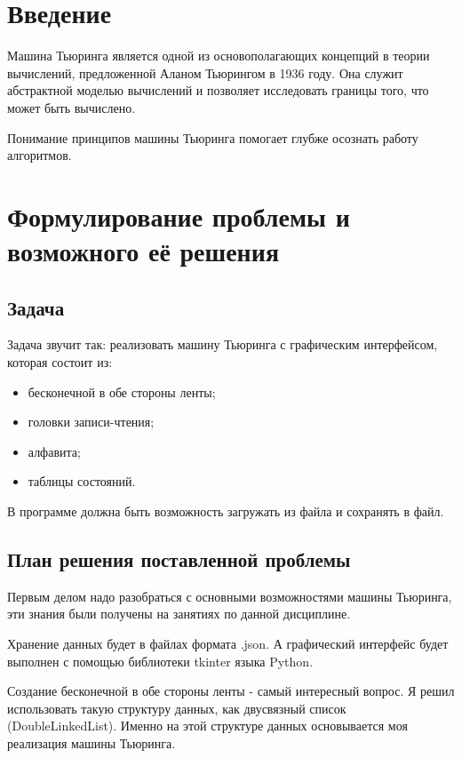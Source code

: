 
\section*{Введение}
\thispagestyle{plain}

Машина Тьюринга является одной из основополагающих концепций в теории вычислений, предложенной Аланом Тьюрингом в 1936 году. Она служит абстрактной моделью вычислений и позволяет исследовать границы того, что может быть вычислено.

Понимание принципов машины Тьюринга помогает глубже осознать работу алгоритмов.

\newpage

\section{Формулирование проблемы и возможного её решения}
\thispagestyle{plain}
\subsection{\textbf{Задача}}

Задача звучит так: реализовать машину Тьюринга с графическим интерфейсом, которая состоит из:

\begin{itemize}[noitemsep,nolistsep]
    \item   бесконечной в обе стороны ленты;
    \item   головки записи-чтения;
    \item   алфавита;
    \item   таблицы состояний.
\end{itemize}

В программе должна быть возможность загружать из файла и сохранять в файл.

\subsection{\textbf{План решения поставленной проблемы}}

Первым делом надо разобраться с основными возможностями машины Тьюринга, эти знания были получены на занятиях по данной дисциплине.

Хранение данных будет в файлах формата .json. А графический интерфейс будет выполнен с помощью библиотеки tkinter\cite{tkinter} языка Python\cite{python}.

Создание бесконечной в обе стороны ленты - самый интересный вопрос. Я решил использовать такую структуру данных, как двусвязный список (DoubleLinkedList)\cite{dll}. Именно на этой структуре данных основывается моя реализация машины Тьюринга.

